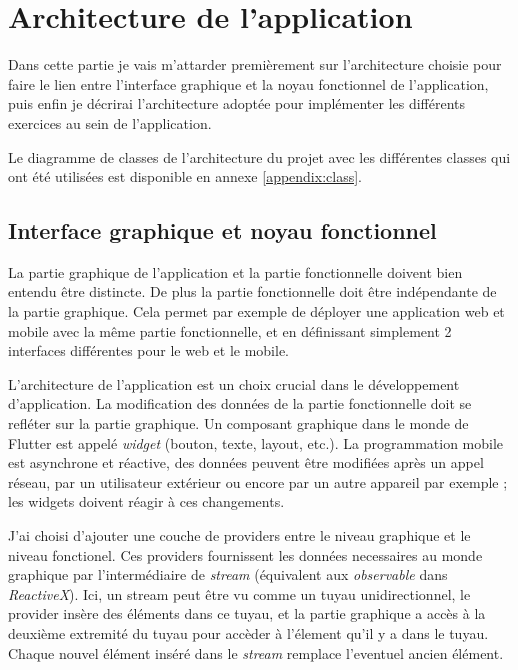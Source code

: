 \section{Architecture de l'application}

Dans cette partie je vais m'attarder premièrement sur l'architecture choisie pour faire le lien entre l'interface graphique et la noyau fonctionnel de l'application, puis enfin je décrirai l'architecture adoptée pour implémenter les différents exercices au sein de l'application.

Le diagramme de classes de l'architecture du projet avec les différentes classes qui ont été utilisées est disponible en annexe \ref{appendix:class}.

\subsection{Interface graphique et noyau fonctionnel}
La partie graphique de l'application et la partie fonctionnelle doivent bien entendu être distincte. De plus la partie fonctionnelle doit être indépendante de la partie graphique. Cela permet par exemple de déployer une application web et mobile avec la même partie fonctionnelle, et en définissant simplement 2 interfaces différentes pour le web et le mobile.

L'architecture de l'application est un choix crucial dans le développement d'application. La modification des données de la partie fonctionnelle doit se refléter sur la partie graphique. Un composant graphique dans le monde de Flutter est appelé \textit{widget} (bouton, texte, layout, etc.). La programmation mobile est asynchrone et réactive, des données peuvent être modifiées après un appel réseau, par un utilisateur extérieur ou encore par un autre appareil par exemple ; les widgets doivent réagir à ces changements.

J'ai choisi d'ajouter une couche de providers entre le niveau graphique et le niveau fonctionel. Ces providers fournissent les données necessaires au monde graphique par l'intermédiaire de \textit{stream} (équivalent aux \textit{observable} dans \textit{ReactiveX}). Ici, un stream peut être vu comme un tuyau unidirectionnel, le provider insère des éléments dans ce tuyau, et la partie graphique a accès à la deuxième extremité du tuyau pour accèder à l'élement qu'il y a dans le tuyau. Chaque nouvel élément inséré dans le \textit{stream} remplace l'eventuel ancien élément.

